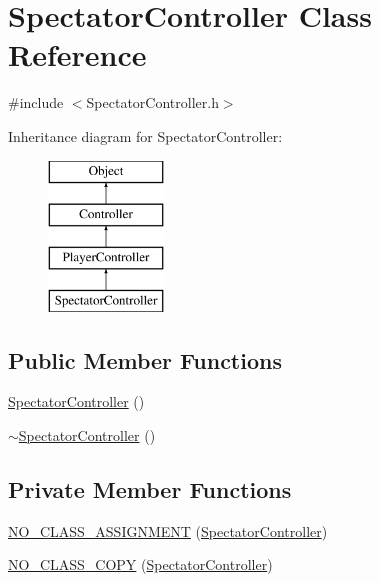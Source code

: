 \section{Spectator\-Controller Class Reference}
\label{class_spectator_controller}


{\ttfamily \#include $<$Spectator\-Controller.\-h$>$}

Inheritance diagram for Spectator\-Controller\-:\begin{figure}[H]
\begin{center}
\leavevmode
\includegraphics[height=4.000000cm]{class_spectator_controller}
\end{center}
\end{figure}
\subsection*{Public Member Functions}
\begin{DoxyCompactItemize}
\item 
\hyperlink{class_spectator_controller_a70d5c0ae5d6383d9f3d04881238b5af7}{Spectator\-Controller} ()
\item 
\hyperlink{class_spectator_controller_ab14323beff2036f9bcf68b0f68488c4d}{$\sim$\-Spectator\-Controller} ()
\end{DoxyCompactItemize}
\subsection*{Private Member Functions}
\begin{DoxyCompactItemize}
\item 
\hyperlink{class_spectator_controller_adc4076623317cccf04958531a0b94f31}{N\-O\-\_\-\-C\-L\-A\-S\-S\-\_\-\-A\-S\-S\-I\-G\-N\-M\-E\-N\-T} (\hyperlink{class_spectator_controller}{Spectator\-Controller})
\item 
\hyperlink{class_spectator_controller_a4df7f1be566e59b516932b17201d6135}{N\-O\-\_\-\-C\-L\-A\-S\-S\-\_\-\-C\-O\-P\-Y} (\hyperlink{class_spectator_controller}{Spectator\-Controller})
\end{DoxyCompactItemize}
